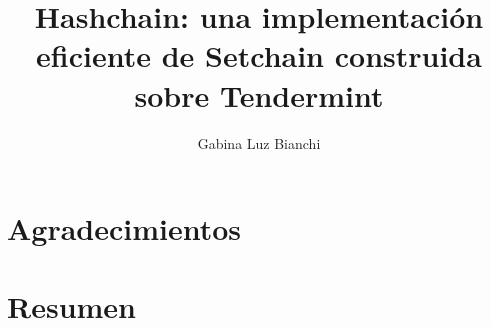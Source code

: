 \documentclass[a4paper, 11pt]{book}
\title{Hashchain: una implementación eficiente de Setchain construida sobre Tendermint}
\author{Gabina Luz Bianchi}
\begin{document}
\frontmatter %




\chapter{Agradecimientos}



\chapter{Resumen}


\tableofcontents{}

\mainmatter %
\end{document}
